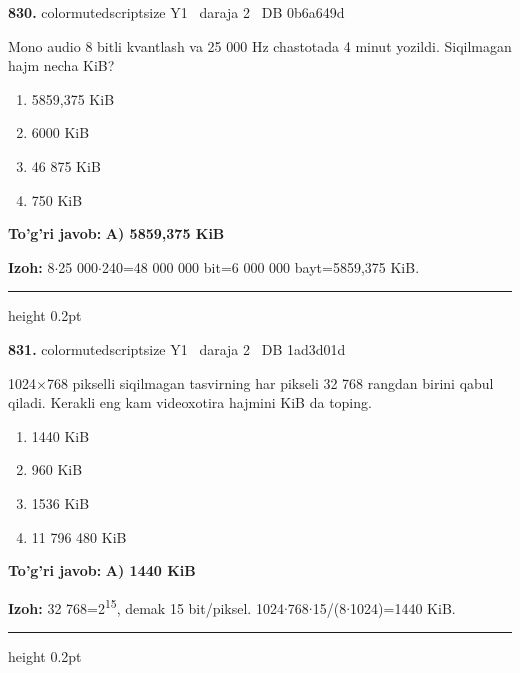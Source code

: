 \documentclass[10pt,a4paper,oneside]{article}
\begin{document}
\noindent\textbf{\color{ink}830.}  {color{muted}scriptsize Y1 \textbullet\ daraja 2 \textbullet\ DB 0b6a649d}
\par
Mono audio 8 bitli kvantlash va 25 000 Hz chastotada 4 minut yozildi. Siqilmagan hajm necha KiB?
\begin{enumerate}[label=\Alph*),leftmargin=9mm]
\item 5859,375 KiB
\item 6000 KiB
\item 46 875 KiB
\item 750 KiB
\end{enumerate}
\begin{tcolorbox}[enhanced,breakable,colback=teal!4,colframe=teal!50!black,boxrule=0.5pt,arc=1.1mm,left=3mm,right=3mm,top=1.7mm,bottom=1.7mm,before skip=2mm,after skip=2mm]
\textbf{\color{teal}To'g'ri javob:} \textbf{A) 5859,375 KiB}
\par\smallskip
\textbf{Izoh:} 8\ensuremath{\cdot}25 000\ensuremath{\cdot}240=48 000 000 bit=6 000 000 bayt=5859,375 KiB.
\end{tcolorbox}
\vspace{2mm}\hrule height 0.2pt \vspace{3mm}

\noindent\textbf{\color{ink}831.}  {color{muted}scriptsize Y1 \textbullet\ daraja 2 \textbullet\ DB 1ad3d01d}
\par
1024\ensuremath{\times}768 pikselli siqilmagan tasvirning har pikseli 32 768 rangdan birini qabul qiladi. Kerakli eng kam videoxotira hajmini KiB da toping.
\begin{enumerate}[label=\Alph*),leftmargin=9mm]
\item 1440 KiB
\item 960 KiB
\item 1536 KiB
\item 11 796 480 KiB
\end{enumerate}
\begin{tcolorbox}[enhanced,breakable,colback=teal!4,colframe=teal!50!black,boxrule=0.5pt,arc=1.1mm,left=3mm,right=3mm,top=1.7mm,bottom=1.7mm,before skip=2mm,after skip=2mm]
\textbf{\color{teal}To'g'ri javob:} \textbf{A) 1440 KiB}
\par\smallskip
\textbf{Izoh:} 32 768=2\textsuperscript{1}\textsuperscript{5}, demak 15 bit/piksel. 1024\ensuremath{\cdot}768\ensuremath{\cdot}15/(8\ensuremath{\cdot}1024)=1440 KiB.
\end{tcolorbox}
\vspace{2mm}\hrule height 0.2pt \vspace{3mm}
\end{document}
